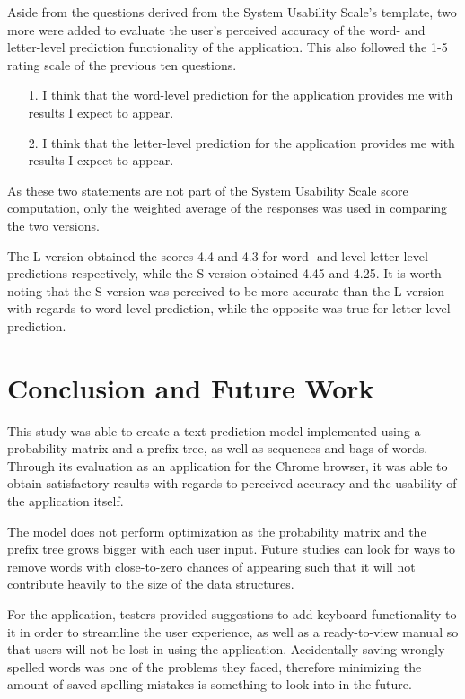 \documentclass[journal]{./IEEE/IEEEtran}
\begin{document}
Aside from the questions derived from the System Usability Scale's template, two more were added to evaluate the user's perceived accuracy of the word- and letter-level prediction functionality of the application. This also followed the 1-5 rating scale of the previous ten questions.

\begin{enumerate}{}

\item[1.] I think that the word-level prediction for the application provides me with results I expect to appear.

\item[2.] I think that the letter-level prediction for the application provides me with results I expect to appear.

\end{enumerate}

As these two statements are not part of the System Usability Scale score computation, only the weighted average of the responses was used in comparing the two versions.

The L version obtained the scores 4.4 and 4.3 for word- and level-letter level predictions respectively, while the S version obtained 4.45 and 4.25. It is worth noting that the S version was perceived to be more accurate than the L version with regards to word-level prediction, while the opposite was true for letter-level prediction.

\section{Conclusion and Future Work}
This study was able to create a text prediction model implemented using a probability matrix and a prefix tree, as well as sequences and bags-of-words. Through its evaluation as an application for the Chrome browser, it was able to obtain satisfactory results with regards to perceived accuracy and the usability of the application itself.

The model does not perform optimization as the probability matrix and the prefix tree grows bigger with each user input. Future studies can look for ways to remove words with close-to-zero chances of appearing such that it will not contribute heavily to the size of the data structures.

For the application, testers provided suggestions to add keyboard functionality to it in order to streamline the user experience, as well as a ready-to-view manual so that users will not be lost in using the application. Accidentally saving wrongly-spelled words was one of the problems they faced, therefore minimizing the amount of saved spelling mistakes is something to look into in the future.
\end{document}
